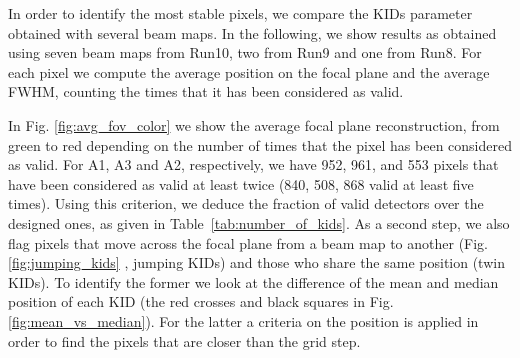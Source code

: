 In order to identify the most stable pixels, we compare the KIDs parameter obtained with several beam maps. 
In the following, we   show results as obtained using seven beam maps from Run10, two from Run9 and one from Run8.
For each pixel we compute the average position on the focal plane and the average FWHM, counting the times that it has been considered as valid.

In Fig. \ref{fig:avg_fov_color} we show the average focal plane
reconstruction, from green to red depending on the number of times
that the pixel has been considered as valid. For A1, A3 and A2,
respectively, we have 952, 961, and 553 pixels that have been
considered as valid at least twice (840, 508, 868 valid at least five
times).
Using this criterion, we deduce the fraction of valid
detectors over the designed ones, as given in Table~\ref{tab:number_of_kids}. 
As a second step, we also flag pixels that move across the focal plane from a beam map to another (Fig. \ref{fig:jumping_kids} , jumping KIDs) and those who share the same position (twin KIDs). To identify the former we look at the difference of the mean and median position of each KID (the red crosses and black squares in Fig. \ref{fig:mean_vs_median}). For the latter a criteria on the position is applied in order to find the pixels that are closer than the grid step.

